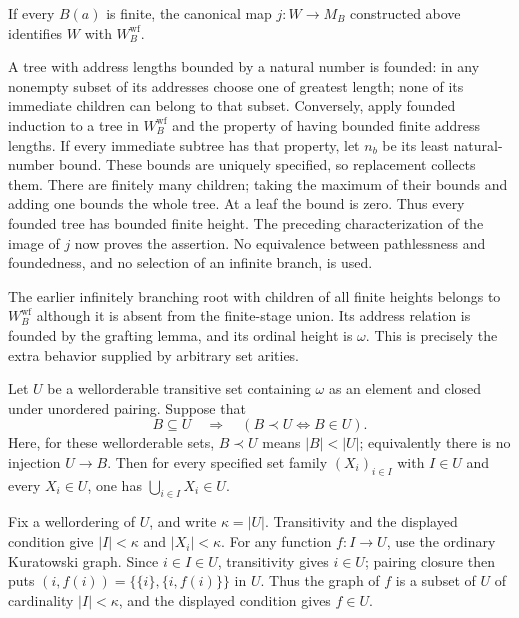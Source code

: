 \begin{proposition}
If every $B(a)$ is finite, the canonical map $j:W\to M_B$ constructed
above identifies $W$ with $W_B^{\mathrm{wf}}$.
\end{proposition}
\Proof
A tree with address lengths bounded by a natural number is founded:
in any nonempty subset of its addresses choose one of greatest length;
none of its immediate children can belong to that subset. Conversely,
apply founded induction to a tree in $W_B^{\mathrm{wf}}$ and the
property of having bounded finite address lengths. If every immediate
subtree has that property, let $n_b$ be its least natural-number bound.
These bounds are uniquely specified, so replacement collects them.
There are finitely many children; taking the maximum of their bounds
and adding one bounds the whole tree. At a leaf the bound is zero.
Thus every founded tree has bounded finite height. The preceding
characterization of the image of $j$ now proves the assertion.
No equivalence between pathlessness and foundedness, and no selection of
an infinite branch, is used.
\Done

The earlier infinitely branching root with children of all finite heights
belongs to $W_B^{\mathrm{wf}}$ although it is absent from the finite-stage
union. Its address relation is founded by the grafting lemma, and its
ordinal height is $\omega$. This is precisely the extra behavior supplied
by arbitrary set arities.

\begin{lemma}
\label{lem:tight_universe_indexed_union}
Let $U$ be a wellorderable transitive set containing $\omega$ as an
element and closed under unordered pairing. Suppose that
\[
B\subseteq U\quad\Longrightarrow\quad
(B\prec U\iff B\in U).
\]
Here, for these wellorderable sets, $B\prec U$ means $|B|<|U|$;
equivalently there is no injection $U\to B$. Then for every specified
set family $(X_i)_{i\in I}$ with $I\in U$ and every $X_i\in U$, one
has $\bigcup_{i\in I}X_i\in U$.
\end{lemma}
\Proof
Fix a wellordering of $U$, and write $\kappa=|U|$. Transitivity and
the displayed condition give $|I|<\kappa$ and $|X_i|<\kappa$.
For any function $f:I\to U$, use the ordinary Kuratowski graph.
Since $i\in I\in U$, transitivity gives $i\in U$; pairing closure
then puts $(i,f(i))=\{\{i\},\{i,f(i)\}\}$ in $U$. Thus the graph
of $f$ is a subset of $U$ of cardinality $|I|<\kappa$, and the
displayed condition gives $f\in U$.

